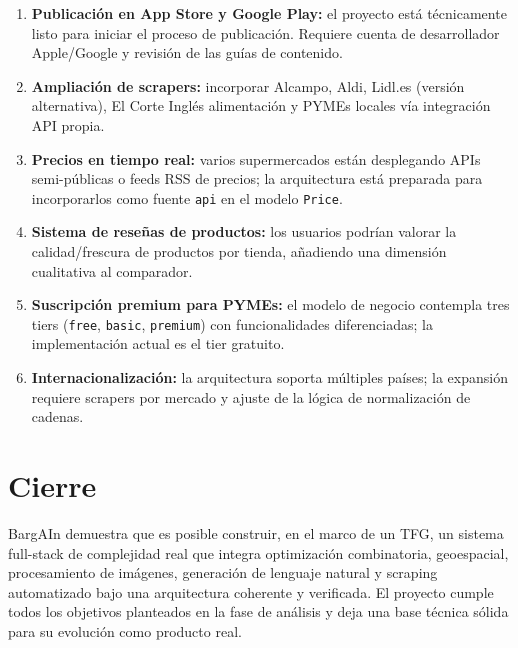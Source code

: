 \begin{enumerate}
  \item \textbf{Publicaci\'on en App Store y Google Play:} el proyecto est\'a t\'ecnicamente listo
    para iniciar el proceso de publicaci\'on. Requiere cuenta de desarrollador Apple/Google y
    revisi\'on de las gu\'ias de contenido.

  \item \textbf{Ampliaci\'on de scrapers:} incorporar Alcampo, Aldi, Lidl.es (versi\'on
    alternativa), El Corte Ingl\'es alimentaci\'on y PYMEs locales v\'ia integraci\'on API propia.

  \item \textbf{Precios en tiempo real:} varios supermercados est\'an desplegando APIs semi-p\'ublicas
    o feeds RSS de precios; la arquitectura est\'a preparada para incorporarlos como fuente
    \texttt{api} en el modelo \texttt{Price}.

  \item \textbf{Sistema de rese\~nas de productos:} los usuarios podr\'ian valorar la
    calidad/frescura de productos por tienda, a\~nadiendo una dimensi\'on cualitativa al
    comparador.

  \item \textbf{Suscripci\'on premium para PYMEs:} el modelo de negocio contempla tres tiers
    (\texttt{free}, \texttt{basic}, \texttt{premium}) con funcionalidades diferenciadas; la
    implementaci\'on actual es el tier gratuito.

  \item \textbf{Internacionalizaci\'on:} la arquitectura soporta m\'ultiples pa\'ises; la
    expansi\'on requiere scrapers por mercado y ajuste de la l\'ogica de normalizaci\'on de
    cadenas.
\end{enumerate}

\section{Cierre}\label{sec:cierre}

BargAIn demuestra que es posible construir, en el marco de un TFG, un sistema full-stack de
complejidad real que integra optimizaci\'on combinatoria, geoespacial, procesamiento de im\'agenes,
generaci\'on de lenguaje natural y scraping automatizado bajo una arquitectura coherente y
verificada. El proyecto cumple todos los objetivos planteados en la fase de an\'alisis y deja una
base t\'ecnica s\'olida para su evoluci\'on como producto real.
